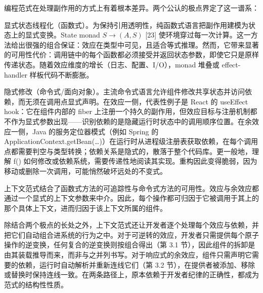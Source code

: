 编程范式在处理副作用的方式上有着根本差异。两个公认的极点界定了这一谱系：

显式状态线程化（函数式）。为保持引用透明性，纯函数式语言把副作用建模为状态上的显式变换。State monad \(S \to ( A , S )\) [23] 使环境穿过每一次计算。这一方法给出很强的组合保证：效应在类型中可见，且适合等式推理。然而，它带来显著的可用性代价：调用链中的每个函数都必须接受并返回状态参数，即使它只是原样传递状态。随着效应维度的增长（日志、配置、I/O），monad 堆叠或 effect-handler 样板代码不断膨胀。

隐式修改（命令式/面向对象）。主流命令式语言允许组件修改共享状态并访问依赖，而无须在调用点显式声明。在效应一侧，代表性例子是 React 的 useEffect hook：它在组件内部的 fiber 上注册一个持久的副作用，但效应目标与注册机制都不作为显式参数出现——识别依赖的是隐藏运行时状态中的调用顺序位置。在余效应一侧，Java 的服务定位器模式（例如 Spring 的 ApplicationContext.getBean(\ldots)）在运行时从进程级注册表获取依赖，在每个调用点都需要判空与类型转换；依赖关系是隐式的，散落于整个代码库。更一般地，理解 f() 如何修改或依赖系统，需要传递性地阅读其实现。重构因此变得脆弱，因为移动或删除一次调用，可能悄然破坏远处的不变式。

上下文范式结合了函数式方法的可追踪性与命令式方法的可用性。效应与余效应都通过一个显式的上下文参数来中介。因此，每个操作都可归因于它被调用于其上的那个具体上下文，进而归因于该上下文所属的组件。

除结合两个极点的长处之外，上下文范式还让开发者逐个处理每个效应与依赖，并把它们自动组合进系统的行为之中。对于可逆转的效应，开发者只需提供每个原子操作的逆变换，任何复合的逆变换则按组合得出（第 3.1 节），因此组件的拆卸是由其装载推导而来，而非与之并列书写。对于响应式的余效应，组件只需声明它需要的依赖，运行时自动解析并重新连线它们（第 3.2 节），在提供者被添加、移除或替换时保持连线一致。在两条路径上，原本依赖于开发者纪律的正确性，都成为范式的结构性性质。

